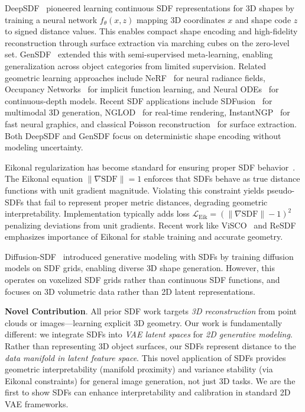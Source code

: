 \documentclass[10pt,twocolumn,letterpaper]{article}
\begin{document}
DeepSDF~\cite{deepsdf} pioneered learning continuous SDF representations for 3D shapes by training a neural network $f_\theta(x, z)$ mapping 3D coordinates $x$ and shape code $z$ to signed distance values. This enables compact shape encoding and high-fidelity reconstruction through surface extraction via marching cubes on the zero-level set. GenSDF~\cite{gensdf} extended this with semi-supervised meta-learning, enabling generalization across object categories from limited supervision. Related geometric learning approaches include NeRF~\cite{mildenhall2020nerf} for neural radiance fields, Occupancy Networks~\cite{mescheder2019occupancy} for implicit function learning, and Neural ODEs~\cite{chen2018neural} for continuous-depth models. Recent SDF applications include SDFusion~\cite{cheng2023sdfusion} for multimodal 3D generation, NGLOD~\cite{takikawa2021nglod} for real-time rendering, InstantNGP~\cite{muller2022instant} for fast neural graphics, and classical Poisson reconstruction~\cite{kazhdan2006poisson,kazhdan2013screened} for surface extraction. Both DeepSDF and GenSDF focus on deterministic shape encoding without modeling uncertainty.

Eikonal regularization has become standard for ensuring proper SDF behavior~\cite{eikonal_consistency2023,visco2023,resdf2024}. The Eikonal equation $\|\nabla \text{SDF}\| = 1$ enforces that SDFs behave as true distance functions with unit gradient magnitude. Violating this constraint yields pseudo-SDFs that fail to represent proper metric distances, degrading geometric interpretability. Implementation typically adds loss $\mathcal{L}_{\text{Eik}} = (\|\nabla \text{SDF}\| - 1)^2$ penalizing deviations from unit gradients. Recent work like ViSCO~\cite{visco2023} and ReSDF~\cite{resdf2024} emphasizes importance of Eikonal for stable training and accurate geometry.

Diffusion-SDF~\cite{diffusion_sdf2023} introduced generative modeling with SDFs by training diffusion models on SDF grids, enabling diverse 3D shape generation. However, this operates on voxelized SDF grids rather than continuous SDF functions, and focuses on 3D volumetric data rather than 2D latent representations.

\textbf{Novel Contribution}. All prior SDF work targets \textit{3D reconstruction} from point clouds or images—learning explicit 3D geometry. Our work is fundamentally different: we integrate SDFs into \textit{VAE latent spaces} for \textit{2D generative modeling}. Rather than representing 3D object surfaces, our SDFs represent distance to the \textit{data manifold in latent feature space}. This novel application of SDFs provides geometric interpretability (manifold proximity) and variance stability (via Eikonal constraints) for general image generation, not just 3D tasks. We are the first to show SDFs can enhance interpretability and calibration in standard 2D VAE frameworks.
\end{document}
